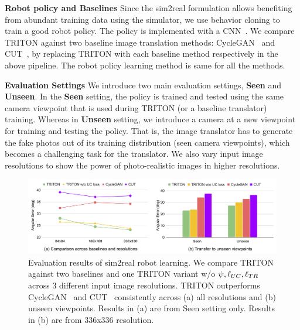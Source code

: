 \documentclass{article}
\begin{document}
\textbf{Robot policy and Baselines}
Since the sim2real formulation allows benefiting from abundant training data using the simulator, we use behavior cloning to train a good robot policy.
The policy is implemented with a CNN~\cite{dqn}.
We compare TRITON against two baseline image translation methods: CycleGAN~\cite{cyclegan} and CUT~\cite{cut}, by replacing TRITON with each baseline method respectively in the above pipeline. The robot policy learning method is same for all the methods.

\textbf{Evaluation Settings} We introduce two main evaluation settings, \textbf{Seen} and \textbf{Unseen}. In the \textbf{Seen} setting, the policy is trained and tested using the same camera viewpoint that is used during TRITON (or a baseline translator) training. Whereas in \textbf{Unseen} setting, we introduce a camera at a new viewpoint for training and testing the policy. That is, the image translator has to generate the fake photos out of its training distribution (seen camera viewpoints), which becomes a challenging task for the translator. We also vary input image resolutions to show the power of photo-realistic images in higher resolutions.

\begin{figure}[tbhp]
    \centering
    \vspace{-3pt}
    \includegraphics[width=.95\textwidth]{../images/sim2real_res.pdf}
    \vspace{-5pt}
    \caption{Evaluation results of sim2real robot learning. We compare TRITON against two baselines and one TRITON variant w/o $\psi,\ell_{UC},\ell_{TR}$ across 3 different input image resolutions. TRITON outperforms CycleGAN~\cite{cyclegan} and CUT~\cite{cut} consistently across (a) all resolutions and (b) unseen viewpoints. Results in (a) are from Seen setting only. Results in (b) are from 336x336 resolution. }
    \label{fig:sim2real}
    \vspace{-3pt}
\end{figure}
\end{document}
